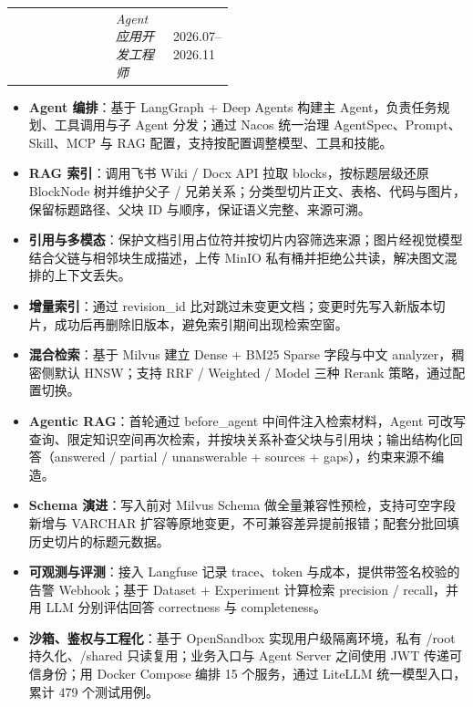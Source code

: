 \documentclass{resume-photo}
\makeatletter
\renewcommand{\heiti}{\bfseries}
\newcommand{\ResumeItemRow}[3]{%
  \par\noindent
  \begin{tabularx}{\linewidth}{@{} >{\raggedright\arraybackslash}X >{\centering\arraybackslash}p{0.26\linewidth} >{\raggedleft\arraybackslash}p{0.22\linewidth} @{}}
    {\heiti #1} & {\textit{#2}} & {#3} \\
  \end{tabularx}
  \par\vspace{1pt}%
}
\makeatother
\begin{document}
\ResumeItemRow{企业知识库问答 Agent{\small\hspace{0.6em}\href{https://github.com/JJ-front/Rag-Agent}{\textcolor{ResumeBlue}{（GitHub超链接）}}}}{Agent应用开发工程师}{2026.07--2026.11}
\begin{itemize}
  \item \textbf{Agent 编排}：基于 LangGraph + Deep Agents 构建主 Agent，负责任务规划、工具调用与子 Agent 分发；通过 Nacos 统一治理 AgentSpec、Prompt、Skill、MCP 与 RAG 配置，支持按配置调整模型、工具和技能。
  \item \textbf{RAG 索引}：调用飞书 Wiki / Docx API 拉取 blocks，按标题层级还原 BlockNode 树并维护父子 / 兄弟关系；分类型切片正文、表格、代码与图片，保留标题路径、父块 ID 与顺序，保证语义完整、来源可溯。
  \item \textbf{引用与多模态}：保护文档引用占位符并按切片内容筛选来源；图片经视觉模型结合父链与相邻块生成描述，上传 MinIO 私有桶并拒绝公共读，解决图文混排的上下文丢失。
  \item \textbf{增量索引}：通过 revision\_id 比对跳过未变更文档；变更时先写入新版本切片，成功后再删除旧版本，避免索引期间出现检索空窗。
  \item \textbf{混合检索}：基于 Milvus 建立 Dense + BM25 Sparse 字段与中文 analyzer，稠密侧默认 HNSW；支持 RRF / Weighted / Model 三种 Rerank 策略，通过配置切换。
  \item \textbf{Agentic RAG}：首轮通过 before\_agent 中间件注入检索材料，Agent 可改写查询、限定知识空间再次检索，并按块关系补查父块与引用块；输出结构化回答（answered / partial / unanswerable + sources + gaps），约束来源不编造。
  \item \textbf{Schema 演进}：写入前对 Milvus Schema 做全量兼容性预检，支持可空字段新增与 VARCHAR 扩容等原地变更，不可兼容差异提前报错；配套分批回填历史切片的标题元数据。
  \item \textbf{可观测与评测}：接入 Langfuse 记录 trace、token 与成本，提供带签名校验的告警 Webhook；基于 Dataset + Experiment 计算检索 precision / recall，并用 LLM 分别评估回答 correctness 与 completeness。
  \item \textbf{沙箱、鉴权与工程化}：基于 OpenSandbox 实现用户级隔离环境，私有 /root 持久化、/shared 只读复用；业务入口与 Agent Server 之间使用 JWT 传递可信身份；用 Docker Compose 编排 15 个服务，通过 LiteLLM 统一模型入口，累计 479 个测试用例。
\end{itemize}
\end{document}
